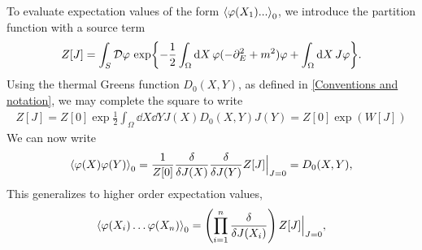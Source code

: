 
To evaluate expectation values of the form $\ex{\varphi(X_1) ... }_0$, we introduce the partition function with a source term
\begin{align}
    Z[J] = \int_S \mathcal{D} \varphi \, \exp{
        - \frac{1}{2} \int_\Omega \dd X \, \varphi (-\partial_E^2 + m^2) \varphi
        + \int_\Omega \dd X \, J \varphi
    }.
\end{align}
Using the thermal Greens function $D_0(X, Y)$, as defined in \autoref{Conventions and notation}, we may complete the square to write
\begin{align}
    Z[J] = Z[0]\exp{\frac{1}{2} \int_{\Omega} \dd X \dd Y J(X) D_0(X, Y) J(Y)}
    = Z[0] \exp(W[J])
\end{align}
We can now write
\begin{equation}
    \ex{\varphi(X)\varphi(Y)}_0 
    = \frac{1}{Z[0]}
    \frac{\delta}{\delta J(X)} \frac{\delta}{\delta J(Y)} 
    Z[J] \Big|_{J=0} 
    = D_0(X, Y),
\end{equation}
This generalizes to higher order expectation values,
\begin{equation}
    \ex{\varphi(X_i) \dots \varphi(X_n)}_0
    = \left(\prod_{i=1}^n \frac{\delta}{\delta J(X_i)}\right) 
    Z[J] \Big|_{J=0},
\end{equation}

